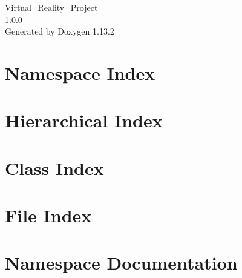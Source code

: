 \documentclass[twoside]{book}
\newcommand{\+}{\discretionary{\mbox{\scriptsize$\hookleftarrow$}}{}{}}
\newcommand{\clearemptydoublepage}{%
    \newpage{\pagestyle{empty}\cleardoublepage}%
  }
\begin{document}
  \raggedbottom
    \hypersetup{pageanchor=false,
                bookmarksnumbered=true,
                pdfencoding=unicode
               }
  \begin{titlepage}
  \vspace*{7cm}
  \begin{center}%
  {\Large Virtual\+\_\+\+Reality\+\_\+\+Project}\\
  [1ex]\large 1.\+0.\+0 \\
  \vspace*{1cm}
  {\large Generated by Doxygen 1.13.2}\\
  \end{center}
  \end{titlepage}
  \clearemptydoublepage
  \tableofcontents
  \clearemptydoublepage
  \hypersetup{pageanchor=true}
\chapter{Namespace Index}

\chapter{Hierarchical Index}

\chapter{Class Index}

\chapter{File Index}

\chapter{Namespace Documentation}

\end{document}
